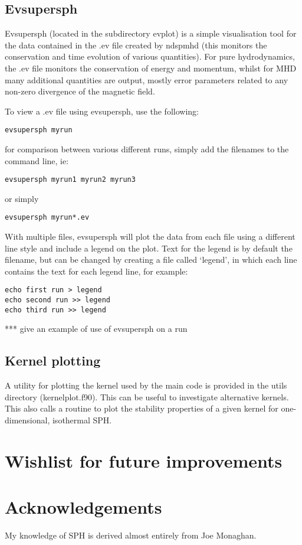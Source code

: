 \documentclass[a4paper,12pt]{article}
\begin{document}
\subsection{Evsupersph}
 Evsupersph (located in the subdirectory evplot) is a simple visualisation tool for the data contained in the
.ev file created by ndspmhd (this monitors the conservation and time evolution
of various quantities). For pure hydrodynamics, the .ev file monitors the
conservation of energy and momentum, whilst for MHD many additional quantities
are output, mostly error parameters related to any non-zero divergence of the
magnetic field.

To view a .ev file using evsupersph, use the following:
\begin{verbatim}
evsupersph myrun
\end{verbatim}
for comparison between various different runs, simply add the filenames to the
command line, ie:
\begin{verbatim}
evsupersph myrun1 myrun2 myrun3
\end{verbatim}
or simply
\begin{verbatim}
evsupersph myrun*.ev
\end{verbatim}
With multiple files, evsupersph will plot the data from each file using a
different line style and include a legend on the plot. Text for the legend is by
default the filename, but can be changed by creating a file called `legend', in
which each line contains the text for each legend line, for example:
\begin{verbatim}
echo first run > legend
echo second run >> legend
echo third run >> legend
\end{verbatim}
*** give an example of use of evsupersph on a run

\subsection{Kernel plotting}
 A utility for plotting the kernel used by the main code is provided in the
utils directory (kernelplot.f90). This can be useful to investigate alternative
kernels. This also calls a routine to plot the stability properties of a given
kernel for one-dimensional, isothermal SPH. 

\section{Wishlist for future improvements}

\section*{Acknowledgements}
 My knowledge of SPH is derived almost entirely from Joe Monaghan.



\end{document}
